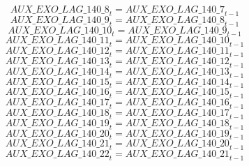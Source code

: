 \begin{dmath}
{AUX\_EXO\_LAG\_140\_8}_{t}={AUX\_EXO\_LAG\_140\_7}_{t-1}
\end{dmath}
\begin{dmath}
{AUX\_EXO\_LAG\_140\_9}_{t}={AUX\_EXO\_LAG\_140\_8}_{t-1}
\end{dmath}
\begin{dmath}
{AUX\_EXO\_LAG\_140\_10}_{t}={AUX\_EXO\_LAG\_140\_9}_{t-1}
\end{dmath}
\begin{dmath}
{AUX\_EXO\_LAG\_140\_11}_{t}={AUX\_EXO\_LAG\_140\_10}_{t-1}
\end{dmath}
\begin{dmath}
{AUX\_EXO\_LAG\_140\_12}_{t}={AUX\_EXO\_LAG\_140\_11}_{t-1}
\end{dmath}
\begin{dmath}
{AUX\_EXO\_LAG\_140\_13}_{t}={AUX\_EXO\_LAG\_140\_12}_{t-1}
\end{dmath}
\begin{dmath}
{AUX\_EXO\_LAG\_140\_14}_{t}={AUX\_EXO\_LAG\_140\_13}_{t-1}
\end{dmath}
\begin{dmath}
{AUX\_EXO\_LAG\_140\_15}_{t}={AUX\_EXO\_LAG\_140\_14}_{t-1}
\end{dmath}
\begin{dmath}
{AUX\_EXO\_LAG\_140\_16}_{t}={AUX\_EXO\_LAG\_140\_15}_{t-1}
\end{dmath}
\begin{dmath}
{AUX\_EXO\_LAG\_140\_17}_{t}={AUX\_EXO\_LAG\_140\_16}_{t-1}
\end{dmath}
\begin{dmath}
{AUX\_EXO\_LAG\_140\_18}_{t}={AUX\_EXO\_LAG\_140\_17}_{t-1}
\end{dmath}
\begin{dmath}
{AUX\_EXO\_LAG\_140\_19}_{t}={AUX\_EXO\_LAG\_140\_18}_{t-1}
\end{dmath}
\begin{dmath}
{AUX\_EXO\_LAG\_140\_20}_{t}={AUX\_EXO\_LAG\_140\_19}_{t-1}
\end{dmath}
\begin{dmath}
{AUX\_EXO\_LAG\_140\_21}_{t}={AUX\_EXO\_LAG\_140\_20}_{t-1}
\end{dmath}
\begin{dmath}
{AUX\_EXO\_LAG\_140\_22}_{t}={AUX\_EXO\_LAG\_140\_21}_{t-1}
\end{dmath}
